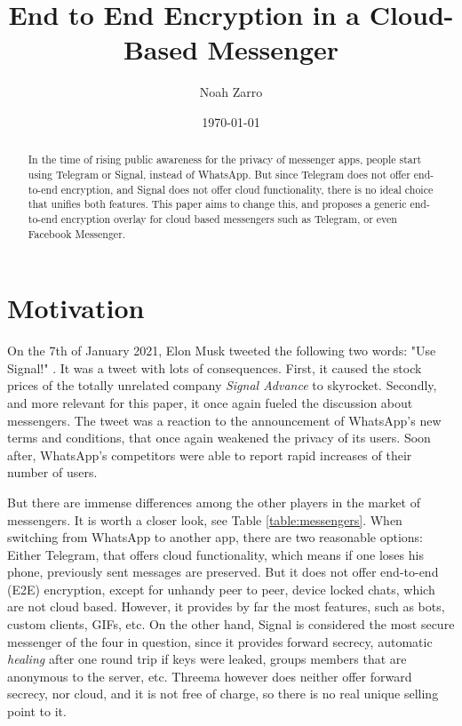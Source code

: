 \documentclass[a4paper, oneside]{discothesis}
\title{End to End Encryption in a Cloud-Based Messenger}
\author{Noah Zarro}
\institute{Distributed Computing Group \\[2pt]
Computer Engineering and Networks Laboratory \\[2pt]
ETH Zürich}
\date{\today}
\begin{document}
\frontmatter %
\maketitle

\cleardoublepage

\begin{abstract}

In the time of rising public awareness for the privacy of messenger apps, people start using Telegram or Signal, instead of WhatsApp. But since Telegram does not offer end-to-end encryption, and Signal does not offer cloud functionality, there is no ideal choice that unifies both features. This paper aims to change this, and proposes a generic end-to-end encryption overlay for cloud based messengers such as Telegram, or even Facebook Messenger.

\end{abstract}

\tableofcontents

\mainmatter %


\chapter{Motivation}
On the 7th of January 2021, Elon Musk tweeted the following two words: "Use Signal!" \cite{Twitter}. It was a tweet with lots of consequences. First, it caused the stock prices of the totally unrelated company \emph{Signal Advance} to skyrocket. Secondly, and more relevant for this paper, it once again fueled the discussion about messengers. The tweet was a reaction to the announcement of WhatsApp's new terms and conditions, that once again weakened the privacy of its users. Soon after, WhatsApp's competitors were able to report rapid increases of their number of users.

But there are immense differences among the other players in the market of messengers. It is worth a closer look, see Table \ref{table:messengers}. When switching from WhatsApp to another app, there are two reasonable options: Either Telegram, that offers cloud functionality, which means if one loses his phone, previously sent messages are preserved. But it does not offer end-to-end (E2E) encryption, except for unhandy peer to peer, device locked chats, which are not cloud based. However, it provides by far the most features, such as bots, custom clients, GIFs, etc. On the other hand, Signal is considered the most secure messenger of the four in question, since it provides forward secrecy, automatic \emph{healing} after one round trip if keys were leaked, groups members that are anonymous to the server, etc. Threema however does neither offer forward secrecy, nor cloud, and it is not free of charge, so there is no real unique selling point to it.
\end{document}
